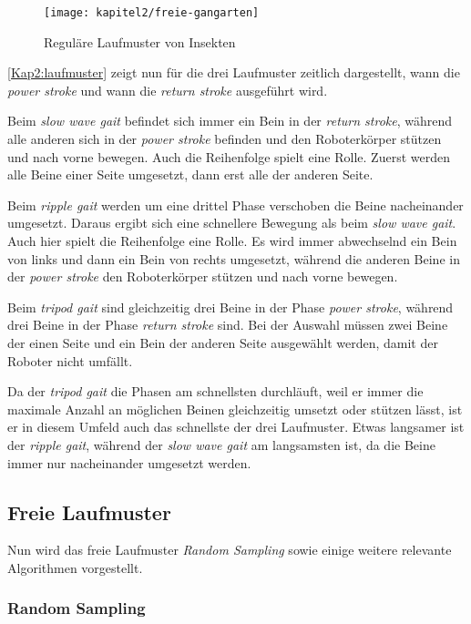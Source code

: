 \begin{figure}[b!]
  \centering
  \texttt{[image: kapitel2/freie-gangarten]}
  \caption{Reguläre Laufmuster von Insekten \autocite{ferrell1995comparison} \autocite{wilson1966insect}}
  \label{Kap2:laufmuster}
\end{figure}

\autoref{Kap2:laufmuster} zeigt nun für die drei Laufmuster zeitlich dargestellt, wann die \emph{power stroke} und wann die \emph{return stroke} ausgeführt wird.

Beim \emph{slow wave gait} befindet sich immer ein Bein in der \emph{return stroke}, während alle anderen sich in der \emph{power stroke} befinden und den Roboterkörper stützen und nach vorne bewegen. Auch die Reihenfolge spielt eine Rolle. Zuerst werden alle Beine einer Seite umgesetzt, dann erst alle der anderen Seite.

Beim \emph{ripple gait} werden um eine drittel Phase verschoben die Beine nacheinander umgesetzt. Daraus ergibt sich eine schnellere Bewegung als beim \emph{slow wave gait}. Auch hier spielt die Reihenfolge eine Rolle. Es wird immer abwechselnd ein Bein von links und dann ein Bein von rechts umgesetzt, während die anderen Beine in der \emph{power stroke} den Roboterkörper stützen und nach vorne bewegen.

Beim \emph{tripod gait} sind gleichzeitig drei Beine in der Phase \emph{power stroke}, während drei Beine in der Phase \emph{return stroke} sind. Bei der Auswahl müssen zwei Beine der einen Seite und ein Bein der anderen Seite ausgewählt werden, damit der Roboter nicht umfällt.

Da der \emph{tripod gait} die Phasen am schnellsten durchläuft, weil er immer die maximale Anzahl an möglichen Beinen gleichzeitig umsetzt oder stützen lässt, ist er in diesem Umfeld auch das schnellste der drei Laufmuster. Etwas langsamer ist der \emph{ripple gait}, während der \emph{slow wave gait} am langsamsten ist, da die Beine immer nur nacheinander umgesetzt werden.

\subsection{Freie Laufmuster}

Nun wird das freie Laufmuster \emph{Random Sampling} sowie einige weitere relevante Algorithmen vorgestellt. \autocite{herms2004}


\subsubsection{Random Sampling}

